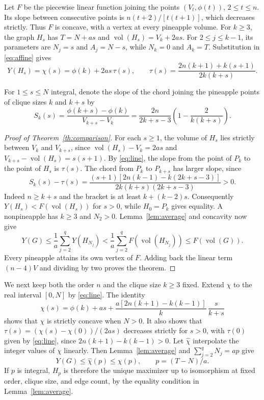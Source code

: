 \documentclass[11pt]{amsart}
\numberwithin{equation}{section}
\DeclareMathOperator{\vol}{vol}
\begin{document}
Let $F$ be the piecewise linear function joining the points
$(V_t,\phi(t))$, $2\le t\le n$. Its slope between consecutive
points is $n(t+2)/[t(t+1)]$, which decreases strictly. Thus $F$ is
concave, with a vertex at every pineapple volume.
For $k\ge3$, the graph $H_s$ has $T=N+as$ and
$\vol(H_s)=V_k+2as$. For $2\le j\le k-1$, its parameters are
$N_j=s$ and $A_j=N-s$, while $N_k=0$ and $A_k=T$.
Substitution in \eqref{eq:affine} gives
\begin{equation}\label{eq:line}
 Y(H_s)=\chi(s)=\phi(k)+2as\,\tau(s),\qquad
 \tau(s)=\frac{2n(k+1)+k(s+1)}{2k(k+s)} .
\end{equation}

For $1\le s\le N$ integral, denote the slope of the chord joining
the pineapple points of clique sizes $k$ and $k+s$ by
\[
 S_k(s)=\frac{\phi(k+s)-\phi(k)}{V_{k+s}-V_k}
       =\frac{2n}{2k+s-3}\left(1-\frac{2}{k(k+s)}\right).
\]

\begin{proof}[Proof of Theorem~\ref{th:comparison}]
For each $s\ge1$, the volume of $H_s$ lies strictly between $V_k$
and $V_{k+s}$, since $\vol(H_s)-V_k=2as$ and
$V_{k+s}-\vol(H_s)=s(s+1)$. By \eqref{eq:line}, the slope from the
point of $P_k$ to the point of $H_s$ is $\tau(s)$. The chord from
$P_k$ to $P_{k+s}$ has larger slope, since
\[
 S_k(s)-\tau(s)=
 \frac{(s+1)[2n(k-1)-k(2k+s-3)]}{2k(k+s)(2k+s-3)}>0 .
\]
Indeed $n\ge k+s$ and the bracket is at least $k+(k-2)s$.
Consequently $Y(H_s)<F(\vol(H_s))$ for $s>0$, while $H_0=P_k$
gives equality. A nonpineapple has $k\ge3$ and $N_2>0$.
Lemma~\ref{lem:average} and concavity now give
\[
 Y(G)\le\frac1a\sum_{j=2}^q Y(H_{N_j})
 <\frac1a\sum_{j=2}^q F(\vol(H_{N_j}))\le F(\vol(G)).
\]
Every pineapple attains its own vertex of $F$. Adding back the
linear term $(n-4)V$ and dividing by two proves the theorem.
\end{proof}

We next keep both the order $n$ and the clique size $k\ge3$ fixed.
Extend $\chi$ to the real interval $[0,N]$ by \eqref{eq:line}. The
identity
\[
 \chi(s)=\phi(k)+as+
 \frac{a[2n(k+1)-k(k-1)]}{k}\,\frac{s}{k+s}
\]
shows that $\chi$ is strictly concave when $N>0$. It also shows
that $\tau(s)=(\chi(s)-\chi(0))/(2as)$ decreases strictly for $s>0$,
with $\tau(0)$ given by \eqref{eq:line}, since
$2n(k+1)-k(k-1)>0$.
Let $\widehat\chi$ interpolate the integer values of $\chi$ linearly. Then
Lemma~\ref{lem:average} and $\sum_{j=2}^q N_j=ap$ give
\begin{equation}\label{eq:int}
 Y(G)\le\widehat\chi(p)\le\chi(p),\qquad p=(T-N)/a.
\end{equation}
If $p$ is integral, $H_p$ is therefore the unique maximizer up to
isomorphism at fixed order, clique size, and edge count, by the equality condition in Lemma~\ref{lem:average}.
\end{document}
